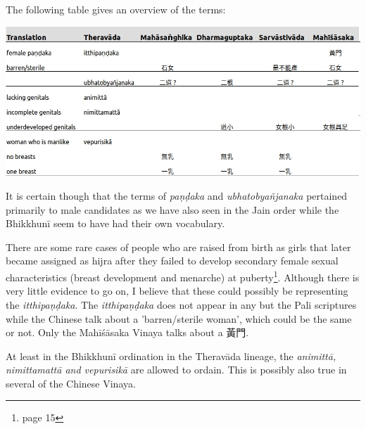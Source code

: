 The following table gives an overview of the terms:

\bigskip
\includegraphics[width=\linewidth]{female.jpg}
\label{female}

It is certain though that the terms of {\em paṇḍaka} and {\em ubhatob­yañ­janaka} pertained primarily to male candidates as we have also seen in the Jain order while the Bhikkhunī seem to have had their own vocabulary.

There are some rare cases of people who are raised from birth as girls that later became assigned as hijra after they failed to develop secondary female sexual characteristics (breast development and menarche) at puberty\footnote{\cite{nanda} page 15}. Although there is very little evidence to go on, I believe that these could possibly be representing the {\em itthipaṇḍaka}. The {\em itthipaṇḍaka} does not appear in any but the Pali scriptures while the Chinese talk about a 'barren/sterile woman', which could be the same or not. Only the Mahīśāsaka Vinaya talks about a 黃門.

At least in the Bhikkhunī ordination in the Theravāda lineage, the {\em animittā, nimittamattā and vepurisikā} are allowed to ordain. This is possibly also true in several of the Chinese Vinaya.

